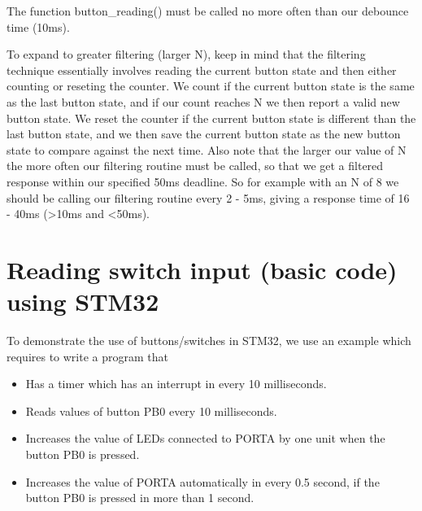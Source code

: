 The function button\_reading() must be called no more often than our debounce time (10ms).

To expand to greater filtering (larger N), keep in mind that the filtering technique essentially involves reading the current button state and then either counting or reseting the counter.  We count if the current button state is the same as the last button state, and if our count reaches N we then report a valid new button state.  We reset the counter if the current button state is different than the last button state, and we then save the current button state as the new button state to compare against the next time.  Also note that the larger our value of N the more often our filtering routine must be called, so that we get a filtered response within our specified 50ms deadline.  So for example with an N of 8 we should be calling our filtering routine every 2 - 5ms, giving a response time of 16 - 40ms (>10ms and <50ms).


\newpage
\section{Reading switch input (basic code) using STM32}


To demonstrate the use of buttons/switches in STM32, we use an example which requires to write a program that 
\begin{itemize}
    \item Has a timer which has an interrupt in every 10 milliseconds.  
    \item Reads values of button PB0 every 10 milliseconds. 
    \item Increases the value of LEDs connected to PORTA by one unit when the button PB0 is pressed.
    \item Increases the value of PORTA automatically in every 0.5 second, if the button PB0 is pressed in more than 1 second.

\end{itemize}
